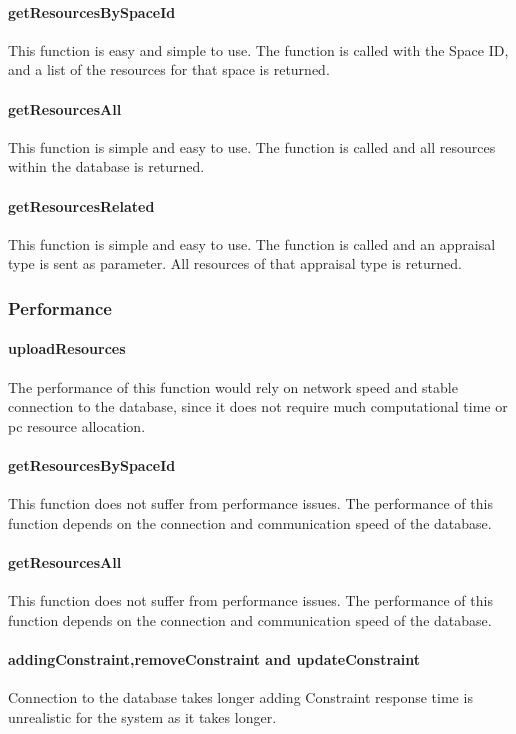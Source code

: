 \documentclass[a4paper]{article}
\begin{document}
\paragraph{getResourcesBySpaceId}
This function is easy and simple to use. The function is called with the Space ID, and a list of the resources for that space is returned.

\paragraph{getResourcesAll}
This function is simple and easy to use. The function is called and all resources within the database is returned.

\paragraph{getResourcesRelated}
This function is simple and easy to use. The function is called and an appraisal type is sent as parameter. All resources of that appraisal type is returned.

\subsubsection {Performance}

\paragraph{uploadResources}
The performance of this function would rely on network speed and stable connection to the database, since it does not require much computational time or pc resource allocation.

\paragraph{getResourcesBySpaceId}
This function does not suffer from performance issues. The performance of this function depends on the connection and communication speed of the database.

\paragraph{getResourcesAll}
This function does not suffer from performance issues. The performance of this function depends on the connection and communication speed of the database.

\paragraph{addingConstraint,removeConstraint and updateConstraint}
Connection to the database takes longer adding Constraint response time is unrealistic for the system as it takes longer.
\end{document}
